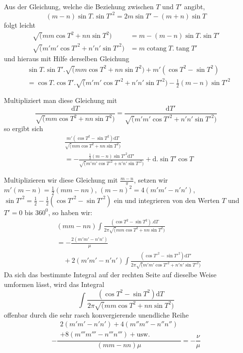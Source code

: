 Aus der Gleichung, welche die Beziehung zwischen $T$ und $T'$ angibt,
\[
(m-n)\sin T.\sin T'^2=2m\sin T'-(m+n)\sin T
\]
folgt leicht
\[
\begin{aligned}
\surd(mm\cos T^2+nn\sin T^2)&=m-(m-n)\sin T.\sin T'\\[6pt]
\surd(m'm'\cos T'^2+n'n'\sin T'^2)&=m\mathop{\mathrm{cotang}}T.\mathop{\mathrm{tang}}T'
\end{aligned}
\]
und hieraus mit Hilfe derselben Gleichung
\[
\begin{aligned}
&\sin T.\sin T'.\surd(mm\cos T^2+nn\sin T^2)+m'(\cos T^2-\sin T^2)\\[6pt]
&=\cos T.\cos T'.\surd(m'm'\cos T'^2+n'n'\sin T'^2)-\tfrac12(m-n)\sin T'^2
\end{aligned}
\]
\par Multipliziert man diese Gleichung mit
\[
\frac{\mathrm{d}T}{\surd(mm\cos T^2+nn\sin T^2)}
=\frac{\mathrm{d}T'}{\surd(m'm'\cos T'^2+n'n'\sin T'^2)}
\]
so ergibt sich
\[
\begin{aligned}&\frac{m'(\cos T^2-\sin T^2)\mathrm{d}T}{\surd(mm\cos T^2+nn\sin T^2)}\\[7pt]&=-\frac{\tfrac12(m-n)\sin T'^2\mathrm{d}T'}{\surd(m'm'\cos T'^2+n'n'\sin T'^2)}+\mathrm{d}.\sin T'\cos T\end{aligned}
\]
\par Multiplizieren wir diese Gleichung mit $\frac{m-n}{\pi}$, setzen wir
$m'(m-n)=\tfrac12(mm-nn)$,
$(m-n)^2=4(m'm'-n'n')$,
$\sin T'^2=\tfrac12-\tfrac12(\cos T'^2-\sin T'^2)$ ein und integrieren von den Werten $T$ und $T'=0$ bis $360^{0}$, so haben wir:
\[
\begin{aligned}
&(mm-nn)\int\frac{(\cos T^2-\sin T^2).\mathrm{d}T}{2\pi\surd(mm\cos T^2+nn\sin T^2)}\\[6pt]
&=-\frac{2(m'm'-n'n')}{\mu}\\[7pt]&\quad+2(m'm'-n'n')\int\frac{(\cos T'^2-\sin T'^2)\mathrm{d}T'}{2\pi\surd(m'm'\cos T'^2+n'n'\sin T'^2)}
\end{aligned}
\]
Da sich das bestimmte Integral auf der rechten Seite auf dieselbe Weise umformen lässt, wird das Integral
\[
\int\frac{(\cos T^2-\sin T^2)\mathrm{d}T}{2\pi\surd(mm\cos T^2+nn\sin T^2)}
\]
offenbar durch die sehr rasch konvergierende unendliche Reihe
\[
-\frac{\begin{gathered}2(m'm'-n'n')+4(m''m''-n''n'')\\+8(m'''m'''-n'''n''')+\mathrm{usw.}\end{gathered}}{(mm-nn)\mu}
=-\frac{\nu}{\mu}
\]
